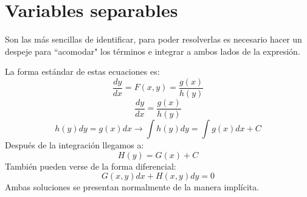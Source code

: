 \documentclass[
	12pt, %
	fleqn, %
	a4paper, %
	oneside, %
]{LegrandOrangeBook}
\begin{document}
\section{Variables separables}
Son las más sencillas de identificar, para poder resolverlas es necesario hacer un despeje para ``acomodar" los términos e integrar a ambos lados de la expresión.
\begin{definition}
La forma estándar de estas ecuaciones es:\\
\begin{displaymath}
\frac{dy}{dx}=F(x,y)=\frac{g(x)}{h(y)}
\end{displaymath}
\begin{displaymath}
\frac{dy}{dx}=\frac{g(x)}{h(y)}
\end{displaymath}
\begin{displaymath}
h(y)dy=g(x)dx \rightarrow \int h(y)dy=\int g(x)dx + C
\end{displaymath}
Después de la integración llegamos a:
\begin{displaymath}
H(y)=G(x)+C
\end{displaymath}
También pueden verse de la forma diferencial:\\
\begin{equation}\label{eq:edprimerorden}
G(x,y)dx+H(x,y)dy=0
\end{equation}
Ambas soluciones se presentan normalmente de la manera implícita.
\end{definition}
\end{document}
